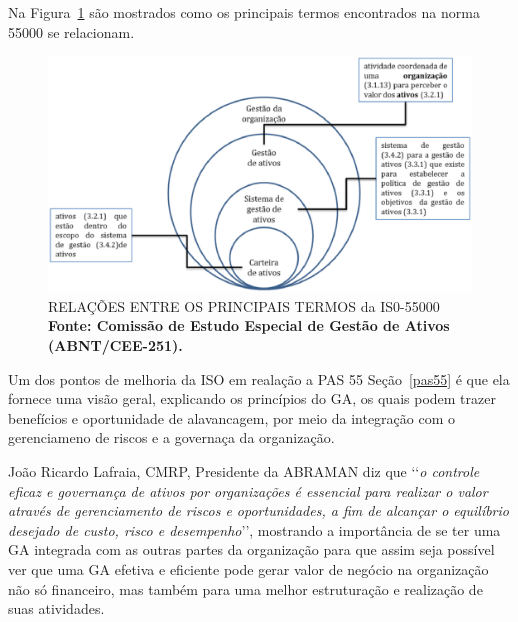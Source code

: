 Na Figura~\ref{termos_iso_55000} são mostrados como os principais termos encontrados na norma 55000 se relacionam.

\graphicspath{{figuras/}}
\begin{figure}[H]
\centering
\includegraphics[width=1.0\textwidth]{termos_iso_55000.eps}
\caption{RELAÇÕES ENTRE OS PRINCIPAIS TERMOS da IS0-55000 \textbf{Fonte: Comissão de Estudo Especial de
Gestão de Ativos (ABNT/CEE-251).}}
\label{termos_iso_55000}
\end{figure}

Um dos pontos de melhoria da ISO em realação a PAS 55 Seção~\ref{pas55} é que ela fornece uma visão geral, explicando os princípios do GA, os quais podem trazer benefícios e oportunidade de alavancagem, por meio da integração com o gerenciameno de riscos e a governaça da organização. 

João Ricardo Lafraia, CMRP, Presidente da ABRAMAN diz que \lq\lq \emph{o controle eficaz e governança de ativos por organizações é essencial para realizar o valor através de gerenciamento de riscos e oportunidades, a fim de alcançar o equilíbrio desejado de custo, risco e desempenho}\rq\rq, mostrando a importância de se ter uma GA integrada com as outras partes da organização para que assim seja possível ver que uma GA efetiva e eficiente pode gerar valor de negócio na organização não só financeiro, mas também para uma melhor estruturação e realização de suas atividades. 



